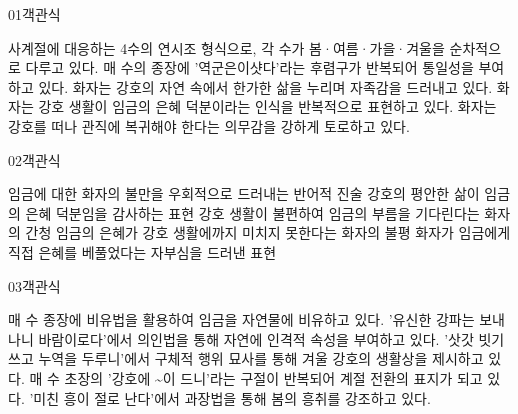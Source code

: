 \documentclass[fs85,seriesWit]{korfarm-base}
\begin{document}
\kfBeginMC
\begin{kfQBlock}{01}{객관식}
\begin{kfChoices}
\kfChoice 사계절에 대응하는 4수의 연시조 형식으로, 각 수가 봄·여름·가을·겨울을 순차적으로 다루고 있다.
\kfChoice 매 수의 종장에 '역군은이샷다'라는 후렴구가 반복되어 통일성을 부여하고 있다.
\kfChoice 화자는 강호의 자연 속에서 한가한 삶을 누리며 자족감을 드러내고 있다.
\kfChoice 화자는 강호 생활이 임금의 은혜 덕분이라는 인식을 반복적으로 표현하고 있다.
\kfChoice 화자는 강호를 떠나 관직에 복귀해야 한다는 의무감을 강하게 토로하고 있다.
\end{kfChoices}
\end{kfQBlock}

\begin{kfQBlock}{02}{객관식}
\begin{kfChoices}
\kfChoice 임금에 대한 화자의 불만을 우회적으로 드러내는 반어적 진술
\kfChoice 강호의 평안한 삶이 임금의 은혜 덕분임을 감사하는 표현
\kfChoice 강호 생활이 불편하여 임금의 부름을 기다린다는 화자의 간청
\kfChoice 임금의 은혜가 강호 생활에까지 미치지 못한다는 화자의 불평
\kfChoice 화자가 임금에게 직접 은혜를 베풀었다는 자부심을 드러낸 표현
\end{kfChoices}
\end{kfQBlock}

\begin{kfQBlock}{03}{객관식}
\begin{kfChoices}
\kfChoice 매 수 종장에 비유법을 활용하여 임금을 자연물에 비유하고 있다.
\kfChoice '유신한 강파는 보내나니 바람이로다'에서 의인법을 통해 자연에 인격적 속성을 부여하고 있다.
\kfChoice '삿갓 빗기 쓰고 누역을 두루니'에서 구체적 행위 묘사를 통해 겨울 강호의 생활상을 제시하고 있다.
\kfChoice 매 수 초장의 '강호에 \textasciitilde{}이 드니'라는 구절이 반복되어 계절 전환의 표지가 되고 있다.
\kfChoice '미친 흥이 절로 난다'에서 과장법을 통해 봄의 흥취를 강조하고 있다.
\end{kfChoices}
\end{kfQBlock}
\end{document}
